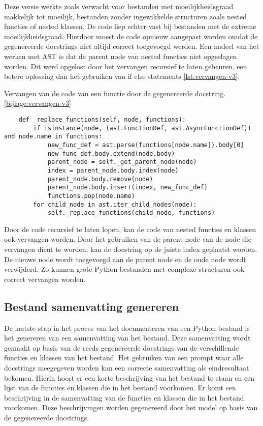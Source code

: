 Deze versie werkte zoals verwacht voor bestanden met moeilijkheidsgraad makkelijk tot moeilijk, bestanden zonder ingewikkelde structuren zoals nested functies of nested klassen.
De code liep echter vast bij bestanden met de extreme moeilijkheidsgraad.
Hierdoor moest de code opnieuw aangepast worden omdat de gegenereerde docstrings niet altijd correct toegevoegd werden.
Een nadeel van het werken met AST is dat de parent node van nested functies niet opgeslagen worden.
Dit werd opgelost door het vervangen recursief te laten gebeuren, een betere oplossing dan het gebruiken van if else statements \ref{lst:vervangen-v3}.

\begin{listing}
    \caption[Code voor het vervangen van een docstring v2]{Vervangen van de code van een functie door de gegenereerde docstring. \ref{bijlage:vervangen-v3}}
    \label{lst:vervangen-v3}
    \begin{verbatim}
    def _replace_functions(self, node, functions):
        if isinstance(node, (ast.FunctionDef, ast.AsyncFunctionDef)) and node.name in functions:
            new_func_def = ast.parse(functions[node.name]).body[0]
            new_func_def.body.extend(node.body)
            parent_node = self._get_parent_node(node)
            index = parent_node.body.index(node)
            parent_node.body.remove(node)
            parent_node.body.insert(index, new_func_def)
            functions.pop(node.name)
        for child_node in ast.iter_child_nodes(node):
            self._replace_functions(child_node, functions)
    \end{verbatim}
\end{listing}

Door de code recursief te laten lopen, kan de code van nested functies en klassen ook vervangen worden.
Door het gebruiken van de parent node van de node die vervangen dient te worden, kan de docstring op de juiste index geplaatst worden.
De nieuwe node wordt toegevoegd aan de parent node en de oude node wordt verwijderd.
Zo kunnen grote Python bestanden met complexe structuren ook correct vervangen worden.

\subsection{Bestand samenvatting genereren}
\label{sec:bestanddocumentatie-samenvatting}
De laatste stap in het proces van het documenteren van een Python bestand is het genereren van een samenvatting van het bestand.
Deze samenvatting wordt gemaakt op basis van de reeds gegenereerde docstrings van de verschillende functies en klassen van het bestand.
Het gebruiken van een prompt waar alle docstrings meegegeven worden kan een correcte samenvatting als eindresultaat bekomen.
Hierin hoort er een korte beschrijving van het bestand te staan en een lijst van de functies en klassen die in het bestand voorkomen.
Er komt een beschrijving in de samenvatting van de functies en klassen die in het bestand voorkomen.
Deze beschrijvingen worden gegenereerd door het model op basis van de gegenereerde docstrings.

